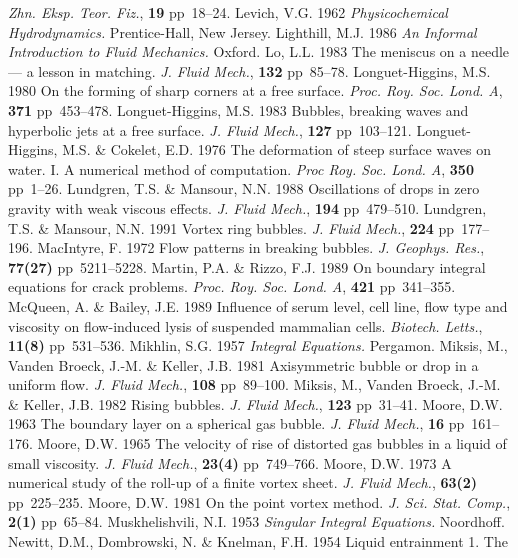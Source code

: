 {\sl Zhn. Eksp. Teor. Fiz.}, {\bf 19} pp~18--24.
\vskip 8pt
Levich, V.G. 1962 {\sl Physicochemical Hydrodynamics.} Prentice-Hall, 
New Jersey.
\vskip 8pt
Lighthill, M.J. 1986 {\sl An Informal Introduction to Fluid Mechanics.}
Oxford.
\vskip 8pt
Lo, L.L. 1983 The meniscus on a needle --- a lesson in matching. 
{\sl J. Fluid Mech.},
{\bf 132} pp~85--78.
\vskip 8pt
Longuet-Higgins, M.S. 1980 On the forming of sharp corners at a free surface.
{\sl Proc. Roy. Soc. Lond. A}, {\bf 371} pp~453--478.
\vskip 8pt
Longuet-Higgins, M.S. 1983 Bubbles, breaking waves and hyperbolic jets 
at a free surface. {\sl J. Fluid Mech.}, {\bf 127} pp~103--121.
\vskip 8pt
Longuet-Higgins, M.S. \& Cokelet, E.D. 1976 The deformation
of steep surface waves on water. I. A numerical method of computation.
{\sl Proc Roy. Soc. Lond. A}, {\bf 350} pp~1--26.
\vskip 8pt
Lundgren, T.S. \& Mansour, N.N. 1988 Oscillations of drops in zero gravity with
weak viscous effects. {\sl J. Fluid Mech.}, {\bf 194} pp~479--510.
\vskip 8pt
Lundgren, T.S. \& Mansour, N.N. 1991 Vortex ring bubbles. {\sl J. Fluid Mech.},
{\bf 224} pp~177--196.
\vskip 8pt
MacIntyre, F. 1972 Flow patterns in breaking bubbles. {\sl J. 
Geophys. Res.}, {\bf 77(27)} pp~5211--5228.
\vskip 8pt
Martin, P.A. \& Rizzo, F.J. 1989 On boundary integral equations for crack
problems. {\sl Proc. Roy. Soc. Lond. A}, {\bf 421} pp~341--355.
\vskip 8pt
McQueen, A. \& Bailey, J.E. 1989 Influence of serum level, cell line, flow type
and viscosity on flow-induced lysis of suspended mammalian cells. {\sl 
Biotech. Letts.}, {\bf 11(8)} pp~531--536.
\vskip 8pt
Mikhlin, S.G. 1957 {\sl Integral Equations.} Pergamon.
\vskip 8pt
Miksis, M., Vanden Broeck, J.-M. \& Keller, J.B. 1981 Axisymmetric 
bubble or drop in a uniform flow. {\sl J. Fluid Mech.}, {\bf 108} 
pp~89--100.
\vskip 8pt
Miksis, M., Vanden Broeck, J.-M. \& Keller, J.B. 1982 Rising 
bubbles. {\sl J. Fluid Mech.}, {\bf 123} pp~31--41.
\vskip 8pt
Moore, D.W. 1963 The boundary layer on a spherical gas bubble.
{\sl J. Fluid Mech.}, {\bf 16} pp~161--176.
\vskip 8pt
Moore, D.W. 1965 The velocity of rise of distorted gas bubbles in a 
liquid of small viscosity. {\sl J. Fluid Mech.}, {\bf 23(4)} pp~749--766.
\vskip 8pt
Moore, D.W. 1973 A numerical study of the roll-up of a finite 
vortex sheet. {\sl J. Fluid Mech.}, {\bf 63(2)} pp~225--235.
\vskip 8pt
Moore, D.W. 1981 On the point vortex method. {\sl J. Sci. Stat. 
Comp.}, {\bf 2(1)} pp~65--84.
\vskip 8pt
Muskhelishvili, N.I. 1953 {\sl Singular Integral Equations.} Noordhoff.
\vskip 8pt
Newitt, D.M., Dombrowski, N. \& Knelman, F.H. 1954 Liquid entrainment 1. The 
